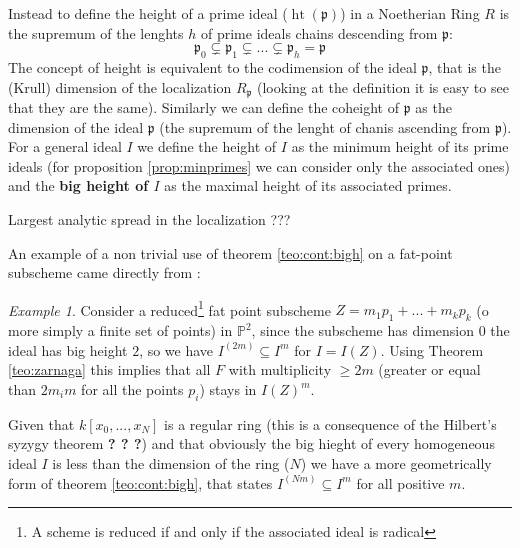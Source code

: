 \documentclass[]{book}
\theoremstyle{plain}
\theoremstyle{remark}
\newtheorem{ex}[rem]{Example}
\theoremstyle{definition}
\newcommand{\PP}{\mathbb{P}}
\newcommand{\p}{\mathfrak{p}}
\newcommand{\cont}[2]{ I^{(#1)} \subseteq I^{#2}}
\DeclareMathOperator{\hgt}{ht}
\begin{document}
	Instead to define the height of a prime ideal ($\hgt ( \p )$) in a Noetherian Ring $ R $ is the supremum of the lenghts $ h $ of prime ideals chains descending from $ \p $:
	\begin{equation}\label{eq:chain}
		\p_0 \subsetneq \p_1 \subsetneq ... \subsetneq \p_{h} = \p
	\end{equation}
	The concept of height is equivalent to the codimension of the ideal $ \p $, that is the (Krull) dimension of the localization $ R_\p $ (looking at the definition it is easy to see that they are the same). Similarly we can define the coheight of $ \p $ as the dimension of the ideal $ \p $ (the supremum of the lenght of chanis ascending from $ \p $). \\
	For a general ideal $ I $ we define the height of $ I $ as the minimum height of its prime ideals (for proposition \ref{prop:minprimes} we can consider only the associated ones) and the \textbf{big height of $ I $} as the maximal height of its associated primes. 
	
	\begin{tcolorbox}
	Largest analytic spread in the localization ???
	\end{tcolorbox}
	
	An example of a non trivial use of theorem \ref{teo:cont:bigh} on a fat-point subscheme came directly from \cite[2.3]{EinLazSmi01}:
	
	\begin{ex}\label{es:P2points}
	Consider a reduced\footnote{A scheme is reduced if and only if the associated ideal is radical} fat point subscheme $ Z = m_1 p_1 + ... +  m_k p_k$ (o more simply a finite set of points) in $ \PP^2 $, since the subscheme has dimension $ 0 $ the ideal has big height $ 2 $, so we have $ \cont{2m}{m} $ for $ I = I(Z) $. Using Theorem \ref{teo:zarnaga} this implies that all $ F $ with multiplicity $ \geq 2m $ (greater or equal than $ 2m_im $ for all the points $ p_i $) stays in $ I(Z)^m $. 
	\end{ex}
	
\begin{tboxprop}
	Given that $ k[x_0, ... , x_N] $ is a regular ring (this is a consequence of the Hilbert's syzygy theorem \textbf{? ? ?}) and that obviously the big hieght of every homogeneous ideal $ I $ is less than the dimension of the ring ($ N $) we have a more geometrically form of theorem \ref{teo:cont:bigh}, that states $ \cont{Nm}{m} $ for all positive $ m $. %
\end{tboxprop}
	
\end{document}
